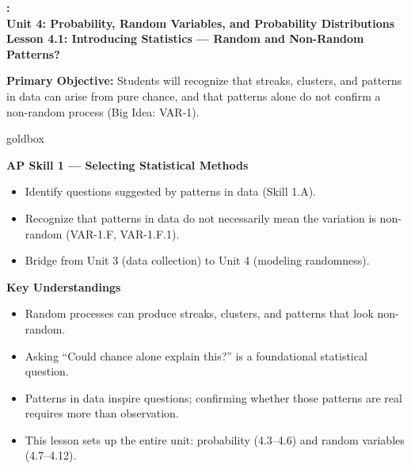 \documentclass[10pt]{article}
\newcommand{\UnitNumberName}{Unit 4: Probability, Random Variables, and Probability Distributions \quad}
\newcommand{\LessonNumberName}{Lesson 4.1: Introducing Statistics --- Random and Non-Random Patterns?}
\begin{document}
\begin{center}
    {\Large\bfseries \CourseName: \SchoolYear \\
    {\small\bfseries \UnitNumberName \LessonNumberName}}
\end{center}

\begin{tcolorbox}[colback=sky, colframe=navy, boxrule=0.9pt, arc=2mm,
    left=2mm, right=2mm, top=1.5mm, bottom=1.5mm]
    \textbf{Primary Objective:} Students will recognize that streaks, clusters, and
    patterns in data can arise from pure chance, and that patterns alone do not confirm
    a non-random process (Big Idea: VAR-1).
\end{tcolorbox}

\renewcommand{\arraystretch}{1.6}
\begin{skillbox}{goldbox}
\begin{minipage}[t]{0.48\linewidth}
    \textbf{AP Skill 1 --- Selecting Statistical Methods}
    \begin{itemize}
        \item Identify questions suggested by patterns in data (Skill 1.A).
        \item Recognize that patterns in data do not necessarily mean the variation is
              non-random (VAR-1.F, VAR-1.F.1).
        \item Bridge from Unit 3 (data collection) to Unit 4 (modeling randomness).
    \end{itemize}
\end{minipage}
\hfill
\begin{minipage}[t]{0.48\linewidth}
    \textbf{Key Understandings}
    \begin{itemize}
        \item Random processes can produce streaks, clusters, and patterns that look
              non-random.
        \item Asking ``Could chance alone explain this?'' is a foundational statistical
              question.
        \item Patterns in data inspire questions; confirming whether those patterns are
              real requires more than observation.
        \item This lesson sets up the entire unit: probability (4.3--4.6) and random
              variables (4.7--4.12).
    \end{itemize}
\end{minipage}
\end{skillbox}
\end{document}
